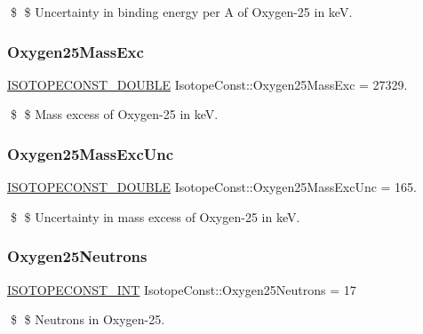 \$ \$ Uncertainty in binding energy per A of Oxygen-\/25 in keV. \mbox{\label{group___isotope_const-_oxygen-_o25_gaceee34e4fe53c1ce29390e5eec3a2816}} 
\subsubsection{\texorpdfstring{Oxygen25\+Mass\+Exc}{Oxygen25MassExc}}
{\footnotesize\ttfamily \mbox{\hyperlink{group___isotope_const-_macros_ga8f45a7272ce02c0b4c65c44636ed719a}{I\+S\+O\+T\+O\+P\+E\+C\+O\+N\+S\+T\+\_\+\+D\+O\+U\+B\+LE}} Isotope\+Const\+::\+Oxygen25\+Mass\+Exc = 27329.}

\$ \$ Mass excess of Oxygen-\/25 in keV. \mbox{\label{group___isotope_const-_oxygen-_o25_ga4ab53295ccc8720531826eea5b4a6ea6}} 
\subsubsection{\texorpdfstring{Oxygen25\+Mass\+Exc\+Unc}{Oxygen25MassExcUnc}}
{\footnotesize\ttfamily \mbox{\hyperlink{group___isotope_const-_macros_ga8f45a7272ce02c0b4c65c44636ed719a}{I\+S\+O\+T\+O\+P\+E\+C\+O\+N\+S\+T\+\_\+\+D\+O\+U\+B\+LE}} Isotope\+Const\+::\+Oxygen25\+Mass\+Exc\+Unc = 165.}

\$ \$ Uncertainty in mass excess of Oxygen-\/25 in keV. \mbox{\label{group___isotope_const-_oxygen-_o25_ga6afe70c03bf1c66503e75468524c9e94}} 
\subsubsection{\texorpdfstring{Oxygen25\+Neutrons}{Oxygen25Neutrons}}
{\footnotesize\ttfamily \mbox{\hyperlink{group___isotope_const-_macros_ga5f18360b3e99483a35c32d789e62621c}{I\+S\+O\+T\+O\+P\+E\+C\+O\+N\+S\+T\+\_\+\+I\+NT}} Isotope\+Const\+::\+Oxygen25\+Neutrons = 17}

\$ \$ Neutrons in Oxygen-\/25. \mbox{\label{group___isotope_const-_oxygen-_o25_ga69aa9793d08b9d203e0e22e1f2185c14}} 
